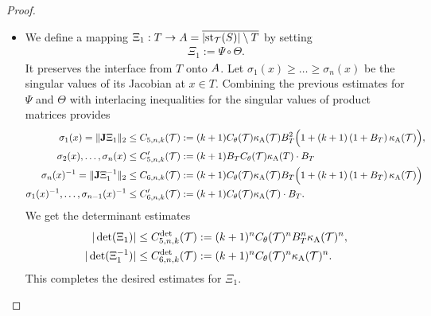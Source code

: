\documentclass[10pt,a4paper]{article}
\begin{document}
\begin{proof}
\begin{itemize}
        
        \item 
        We define a mapping $ \Xi_{1} : T \rightarrow A = \overline{ \left|  \operatorname{st}_{{\mathcal T}}(S)  \right| \setminus T}$ by setting 
        \begin{align*}
            \Xi_{1} := \Psi \circ \Theta.
        \end{align*}
        It preserves the interface from $T$ onto $A$. 
        Let $\sigma_1(x) \geq \dots \geq \sigma_n(x)$ be the singular values of its Jacobian at $x \in T$. 
        Combining the previous estimates for $\Psi$ and $\Theta$ with interlacing inequalities for the singular values of product matrices provides 
        \begin{align*}
            \sigma_1(x) = \|  {\mathbf{J}} \Xi_{1}  \|_{2}
            &\leq 
            C_{5,n,k}({\mathcal T})
            :=
            (k+1) 
            C_\theta({\mathcal T})
            \kappa_{\rm A}({\mathcal T})
            B_{T}^{2}
            \Big( 
                1 
                + 
                (k+1) 
                \left( 1 + B_{T} \right)
                \kappa_{\rm A}({\mathcal T})
            \Big)            
            ,
            \\
            \sigma_2(x), \dots, \sigma_n(x) 
            &\leq 
            C'_{5,n,k}({\mathcal T})
            :=
            (k+1)B_{T}
            C_\theta({\mathcal T})
            \kappa_{\rm A}(T) 
            \cdot 
            B_T
            \\
            \sigma_n(x)^{-1} = \|  {\mathbf{J}} \Xi_{1}^{-1}  \|_{2}
            &\leq
            C_{6,n,k}({\mathcal T})
            :=
            (k+1) 
            C_\theta({\mathcal T})
            \kappa_{\rm A}({\mathcal T})
            B_{T}
            \Big( 
                1 
                + 
                (k+1) 
                \left( 1 + B_{T} \right)
                \kappa_{\rm A}({\mathcal T})
            \Big)
            \\
            \sigma_1(x)^{-1}, \dots, \sigma_{n-1}(x)^{-1}
            &\leq 
            C'_{6,n,k}({\mathcal T})
            :=
            (k+1)
            C_\theta({\mathcal T})
            \kappa_{\rm A}({\mathcal T}) 
            \cdot 
            B_T
            .
        \end{align*}
        We get the determinant estimates
        \begin{align*}
            |\det(\Xi_{1})|
            &\leq 
            C^{\det}_{5,n,k}({\mathcal T})
            :=
            (k+1)^{n}
            C_\theta({\mathcal T})^{n}
            B_{T}^{n}
            \kappa_{\rm A}({\mathcal T})^{n}
            ,
            \\
            |\det(\Xi_{1}^{-1})|
            &\leq 
            C^{\det}_{6,n,k}({\mathcal T})
            :=
            (k+1)^{n}
            C_\theta({\mathcal T})^{n}
            \kappa_{\rm A}({\mathcal T})^{n}
            .
        \end{align*}
        This completes the desired estimates for $\Xi_{1}$. 
        

\end{itemize}
\end{proof}
\end{document}

